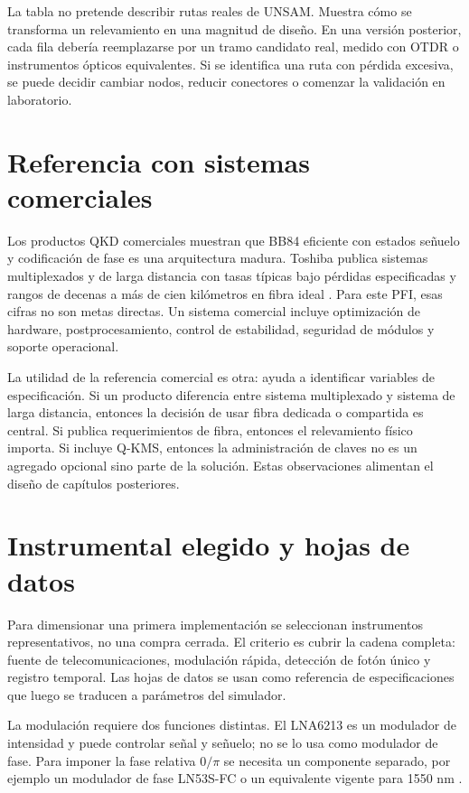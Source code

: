 La tabla no pretende describir rutas reales de UNSAM. Muestra cómo se transforma un relevamiento en una magnitud de diseño. En una versión posterior, cada fila debería reemplazarse por un tramo candidato real, medido con OTDR o instrumentos ópticos equivalentes. Si se identifica una ruta con pérdida excesiva, se puede decidir cambiar nodos, reducir conectores o comenzar la validación en laboratorio.

\section{Referencia con sistemas comerciales}

Los productos QKD comerciales muestran que BB84 eficiente con estados señuelo y codificación de fase es una arquitectura madura. Toshiba publica sistemas multiplexados y de larga distancia con tasas típicas bajo pérdidas especificadas y rangos de decenas a más de cien kilómetros en fibra ideal \cite{toshibaQKDProducts}. Para este PFI, esas cifras no son metas directas. Un sistema comercial incluye optimización de hardware, postprocesamiento, control de estabilidad, seguridad de módulos y soporte operacional.

La utilidad de la referencia comercial es otra: ayuda a identificar variables de especificación. Si un producto diferencia entre sistema multiplexado y sistema de larga distancia, entonces la decisión de usar fibra dedicada o compartida es central. Si publica requerimientos de fibra, entonces el relevamiento físico importa. Si incluye Q-KMS, entonces la administración de claves no es un agregado opcional sino parte de la solución. Estas observaciones alimentan el diseño de capítulos posteriores.

\section{Instrumental elegido y hojas de datos}

Para dimensionar una primera implementación se seleccionan instrumentos representativos, no una compra cerrada. El criterio es cubrir la cadena completa: fuente de telecomunicaciones, modulación rápida, detección de fotón único y registro temporal. Las hojas de datos se usan como referencia de especificaciones que luego se traducen a parámetros del simulador.

La modulación requiere dos funciones distintas. El LNA6213 es un modulador de intensidad y puede controlar señal y señuelo; no se lo usa como modulador de fase. Para imponer la fase relativa \(0/\pi\) se necesita un componente separado, por ejemplo un modulador de fase LN53S-FC o un equivalente vigente para 1550 nm \cite{thorlabsLNA6213,thorlabsLN53SFC}.

